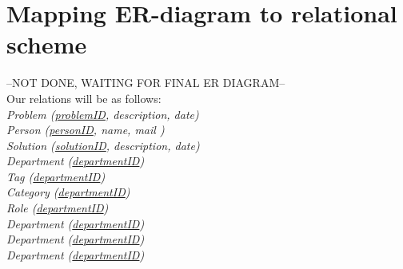 \section{Mapping ER-diagram to relational scheme}
\label{sec:map_er_rel}

--NOT DONE, WAITING FOR FINAL ER DIAGRAM--\\
Our relations will be as follows: \\

\textit{Problem (\underline{problemID}, description, date)} \\
\textit{Person (\underline{personID}, name, mail )} \\
\textit{Solution (\underline{solutionID}, description, date)} \\
\textit{Department (\underline{departmentID})} \\
\textit{Tag (\underline{departmentID})} \\
\textit{Category (\underline{departmentID})} \\
\textit{Role (\underline{departmentID})} \\
\textit{Department (\underline{departmentID})} \\
\textit{Department (\underline{departmentID})} \\
\textit{Department (\underline{departmentID})} \\



